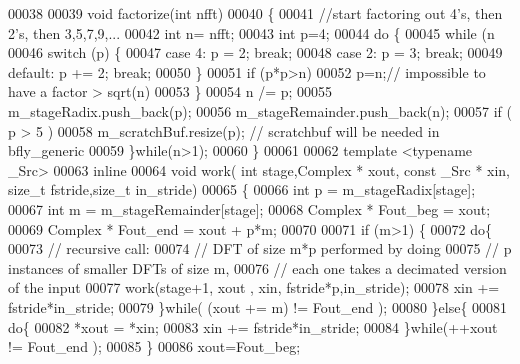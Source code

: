 \begin{DoxyCode}
00038 
00039   \textcolor{keywordtype}{void} factorize(\textcolor{keywordtype}{int} nfft)
00040   \{
00041     \textcolor{comment}{//start factoring out 4's, then 2's, then 3,5,7,9,...}
00042     \textcolor{keywordtype}{int} n= nfft;
00043     \textcolor{keywordtype}{int} p=4;
00044     \textcolor{keywordflow}{do} \{
00045       \textcolor{keywordflow}{while} (n %
00046         \textcolor{keywordflow}{switch} (p) \{
00047           \textcolor{keywordflow}{case} 4: p = 2; \textcolor{keywordflow}{break};
00048           \textcolor{keywordflow}{case} 2: p = 3; \textcolor{keywordflow}{break};
00049           \textcolor{keywordflow}{default}: p += 2; \textcolor{keywordflow}{break};
00050         \}
00051         \textcolor{keywordflow}{if} (p*p>n)
00052           p=n;\textcolor{comment}{// impossible to have a factor > sqrt(n)}
00053       \}
00054       n /= p;
00055       m\_stageRadix.push\_back(p);
00056       m\_stageRemainder.push\_back(n);
00057       \textcolor{keywordflow}{if} ( p > 5 )
00058         m\_scratchBuf.resize(p); \textcolor{comment}{// scratchbuf will be needed in bfly\_generic}
00059     \}\textcolor{keywordflow}{while}(n>1);
00060   \}
00061 
00062   \textcolor{keyword}{template} <\textcolor{keyword}{typename} \_Src>
00063     \textcolor{keyword}{inline}
00064     \textcolor{keywordtype}{void} work( \textcolor{keywordtype}{int} stage,Complex * xout, \textcolor{keyword}{const} \_Src * xin, \textcolor{keywordtype}{size\_t} fstride,\textcolor{keywordtype}{size\_t} in\_stride)
00065     \{
00066       \textcolor{keywordtype}{int} p = m\_stageRadix[stage];
00067       \textcolor{keywordtype}{int} m = m\_stageRemainder[stage];
00068       Complex * Fout\_beg = xout;
00069       Complex * Fout\_end = xout + p*m;
00070 
00071       \textcolor{keywordflow}{if} (m>1) \{
00072         \textcolor{keywordflow}{do}\{
00073           \textcolor{comment}{// recursive call:}
00074           \textcolor{comment}{// DFT of size m*p performed by doing}
00075           \textcolor{comment}{// p instances of smaller DFTs of size m, }
00076           \textcolor{comment}{// each one takes a decimated version of the input}
00077           work(stage+1, xout , xin, fstride*p,in\_stride);
00078           xin += fstride*in\_stride;
00079         \}\textcolor{keywordflow}{while}( (xout += m) != Fout\_end );
00080       \}\textcolor{keywordflow}{else}\{
00081         \textcolor{keywordflow}{do}\{
00082           *xout = *xin;
00083           xin += fstride*in\_stride;
00084         \}\textcolor{keywordflow}{while}(++xout != Fout\_end );
00085       \}
00086       xout=Fout\_beg;

\end{DoxyCode}
